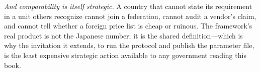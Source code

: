 \emph{And comparability is itself strategic.} A country that cannot state its requirement in a unit others recognize cannot join a federation, cannot audit a vendor's claim, and cannot tell whether a foreign price list is cheap or ruinous. The framework's real product is not the Japanese number; it is the shared definition---which is why the invitation it extends, to run the protocol and publish the parameter file, is the least expensive strategic action available to any government reading this book.
